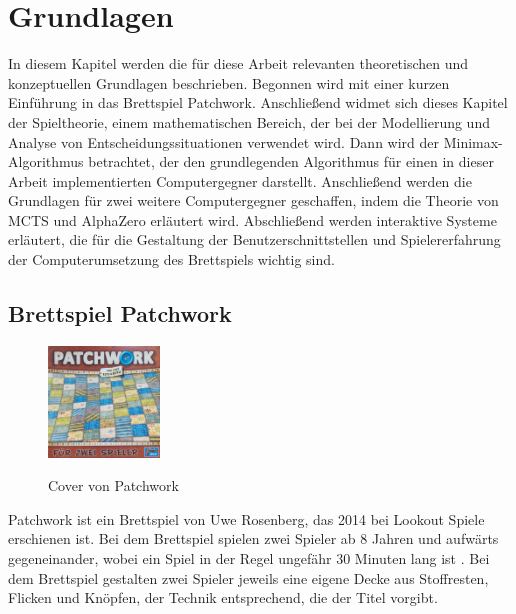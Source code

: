 \chapter{Grundlagen}
\label{chapter:grundlagen}

In diesem Kapitel werden die für diese Arbeit relevanten theoretischen und konzeptuellen Grundlagen beschrieben. Begonnen wird mit einer kurzen Einführung in das Brettspiel Patchwork. Anschließend widmet sich dieses Kapitel der Spieltheorie, einem mathematischen Bereich, der bei der Modellierung und Analyse von Entscheidungssituationen verwendet wird. Dann wird der Minimax-Algorithmus betrachtet, der den grundlegenden Algorithmus für einen in dieser Arbeit implementierten Computergegner darstellt. Anschließend werden die Grundlagen für zwei weitere Computergegner geschaffen, indem die Theorie von \acl{MCTS} und AlphaZero erläutert wird. Abschließend werden interaktive Systeme erläutert, die für die Gestaltung der Benutzerschnittstellen und Spielererfahrung der Computerumsetzung des Brettspiels wichtig sind.

\section{Brettspiel Patchwork}
\label{chapter:brettspiel-patchwork}

\begin{figure}
    \centering
    \vspace*{-1.3cm}
    \vspace*{-0.75cm}
    \includegraphics[width=0.265\textwidth]{res/pictures/assets/patchwork-cover.png}
    \caption[Cover von Patchwork]{\unskip}
    Cover von Patchwork
    \label{fig:patchwork-cover}
    \vspace*{-0.75cm}
\end{figure}

Patchwork ist ein Brettspiel von Uwe Rosenberg, das 2014 bei Lookout Spiele erschienen ist. Bei dem Brettspiel spielen zwei Spieler ab 8 Jahren und aufwärts gegeneinander, wobei ein Spiel in der Regel ungefähr 30 Minuten lang ist \cite{LookoutSpielePatchwork}. Bei dem Brettspiel gestalten zwei Spieler jeweils eine eigene Decke aus Stoffresten, Flicken und Knöpfen, der Technik entsprechend, die der Titel vorgibt. \cite{SpielDesJahresPatchwork}

